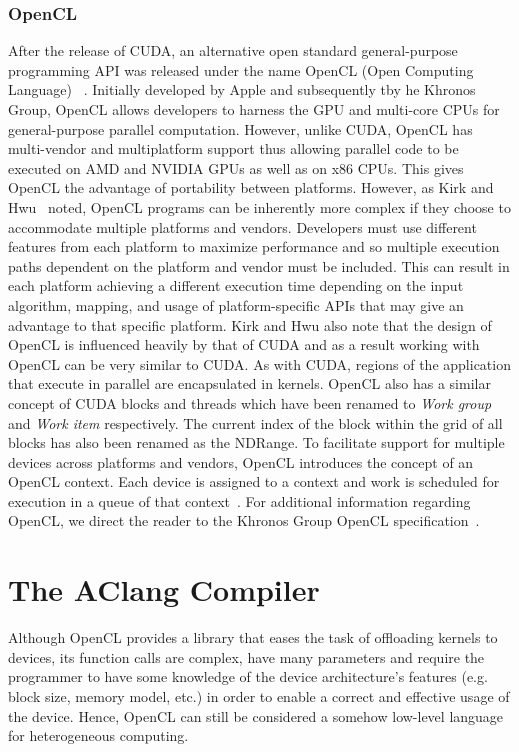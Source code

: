 \documentclass[Ingles]{ic-tese-v1}
\newcommand{\tit}[1]{{\textit{#1}}}
\begin{document}
\subsubsection{OpenCL}

After the release of CUDA, an alternative open standard general-purpose programming
API was released under the name OpenCL (Open Computing Language) ~\cite{Kirk:2012}.
Initially developed by Apple and subsequently tby he Khronos Group, OpenCL allows
developers to harness the GPU and multi-core CPUs for general-purpose parallel
computation. However, unlike CUDA, OpenCL has multi-vendor and multiplatform
support thus allowing parallel code to be executed on AMD and NVIDIA GPUs
as well as on x86 CPUs. This gives OpenCL the advantage of portability between
platforms. However, as Kirk and Hwu~\cite{Kirk:2012} noted, OpenCL programs
can be inherently more complex if they choose to accommodate multiple platforms and vendors.
Developers must use different features from each platform to maximize performance
and so multiple execution paths dependent on the platform and vendor must be
included. This can result in each platform achieving a different execution time
depending on the input algorithm, mapping, and usage of platform-specific APIs
that may give an advantage to that specific platform. Kirk and Hwu also note
that the design of OpenCL is influenced heavily by that of CUDA and as a result
working with OpenCL can be very similar to CUDA. As with CUDA, regions of
the application that execute in parallel are encapsulated in kernels. OpenCL also
has a similar concept of CUDA blocks and threads which have been renamed to
\tit{Work group} and \tit{Work item} respectively. The current index of the block within the
grid of all blocks has also been renamed as the NDRange. To facilitate support for
multiple devices across platforms and vendors, OpenCL introduces the concept of
an OpenCL context. Each device is assigned to a context and work is scheduled
for execution in a queue of that context~\cite{Kirk:2012}. For additional information
regarding OpenCL, we direct the reader to the Khronos Group OpenCL
specification~\cite{opencl}.

\section{The AClang Compiler}
\label{sec:AClang}

Although OpenCL provides  a library that eases the  task of offloading
kernels  to  devices,  its  function  calls  are  complex,  have  many
parameters and  require the programmer  to have some knowledge  of the
device architecture's  features (e.g. block size,  memory model, etc.)
in order to enable a correct and effective usage of the device. Hence,
OpenCL  can  still  be  considered a  somehow  low-level  language  for
heterogeneous computing.
\end{document}
